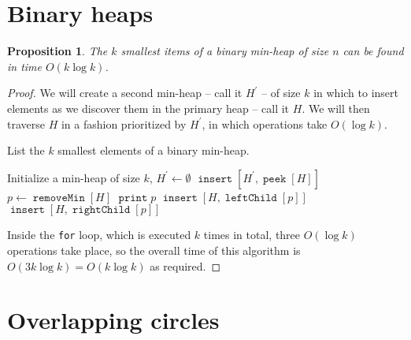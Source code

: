 \documentclass{article}
\newtheorem{proposition}{Proposition}
\DeclareMathOperator{\Peek}{\mathtt{peek}}
\DeclareMathOperator{\Insert}{\mathtt{insert}}
\DeclareMathOperator{\print}{\mathtt{print}}
\DeclareMathOperator{\leftChild}{\mathtt{leftChild}}
\DeclareMathOperator{\rightChild}{\mathtt{rightChild}}
\DeclareMathOperator{\RemoveMin}{\mathtt{removeMin}}
\begin{document}
\section{Binary heaps}

\begin{proposition}
    The $k$ smallest items of a binary min-heap of size $n$ can be found in
    time $O(k \log k)$.
\end{proposition}

\begin{proof}
    We will create a second min-heap -- call it $H^\prime$ -- of size $k$ in
    which to insert elements as we discover them in the primary heap -- call it
    $H$. We will then traverse $H$ in a fashion prioritized by $H^\prime$, in
    which operations take $O(\log{k})$.

    \begin{algorithm}
        \caption{List the $k$ smallest elements of a binary min-heap.}
        \begin{algorithmic}
                \State Initialize a min-heap of size $k$, $H^\prime \gets
                \emptyset$
                \State $\Insert{[H^\prime, \Peek{[H]}]}$
                 
                    \State $p \gets \RemoveMin{[H]}$ 
                    \State $\print{p}$
                    \State $\Insert{[H, \leftChild{[p]}]}$
                    \State $\Insert{[H, \rightChild{[p]}]}$
                \EndFor
            \EndFunction
        \end{algorithmic}
    \end{algorithm}

    Inside the \texttt{for} loop, which is executed $k$ times in total, three
    $O(\log k)$ operations take place, so the overall time of this algorithm is
    $O(3k\log k) = O(k\log k)$ as required.
\end{proof}

\section{Overlapping circles}
\end{document}
